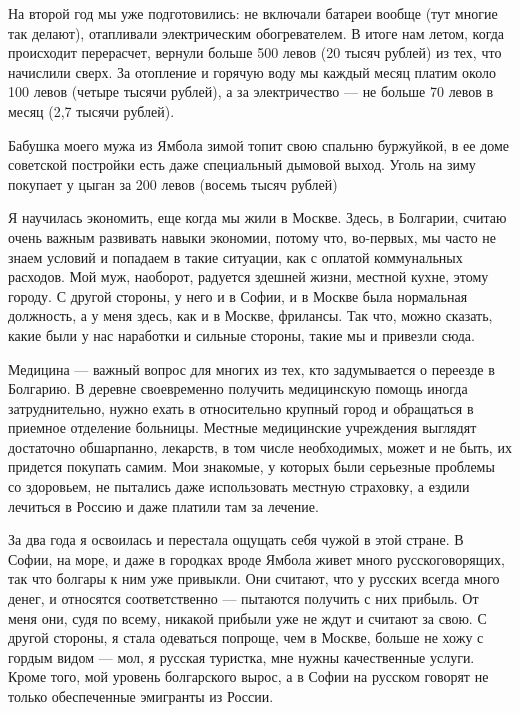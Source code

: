 На второй год мы уже подготовились: не включали батареи вообще (тут многие так делают), отапливали электрическим обогревателем. В итоге нам летом, когда происходит перерасчет, вернули больше 500 левов (20 тысяч рублей) из тех, что начислили сверх. За отопление и горячую воду мы каждый месяц платим около 100 левов (четыре тысячи рублей), а за электричество — не больше 70 левов в месяц (2,7 тысячи рублей).

\begin{fancyquotes}
    Бабушка моего мужа из Ямбола зимой топит свою спальню буржуйкой, в ее доме советской постройки есть даже специальный дымовой выход. Уголь на зиму покупает у цыган за 200 левов (восемь тысяч рублей)
\end{fancyquotes}

Я научилась экономить, еще когда мы жили в Москве. Здесь, в Болгарии, считаю очень важным развивать навыки экономии, потому что, во-первых, мы часто не знаем условий и попадаем в такие ситуации, как с оплатой коммунальных расходов. Мой муж, наоборот, радуется здешней жизни, местной кухне, этому городу. С другой стороны, у него и в Софии, и в Москве была нормальная должность, а у меня здесь, как и в Москве, фрилансы. Так что, можно сказать, какие были у нас наработки и сильные стороны, такие мы и привезли сюда.

Медицина — важный вопрос для многих из тех, кто задумывается о переезде в Болгарию. В деревне своевременно получить медицинскую помощь иногда затруднительно, нужно ехать в относительно крупный город и обращаться в приемное отделение больницы. Местные медицинские учреждения выглядят достаточно обшарпанно, лекарств, в том числе необходимых, может и не быть, их придется покупать самим. Мои знакомые, у которых были серьезные проблемы со здоровьем, не пытались даже использовать местную страховку, а ездили лечиться в Россию и даже платили там за лечение.

За два года я освоилась и перестала ощущать себя чужой в этой стране. В Софии, на море, и даже в городках вроде Ямбола живет много русскоговорящих, так что болгары к ним уже привыкли. Они считают, что у русских всегда много денег, и относятся соответственно — пытаются получить с них прибыль. От меня они, судя по всему, никакой прибыли уже не ждут и считают за свою. С другой стороны, я стала одеваться попроще, чем в Москве, больше не хожу с гордым видом — мол, я русская туристка, мне нужны качественные услуги. Кроме того, мой уровень болгарского вырос, а в Софии на русском говорят не только обеспеченные эмигранты из России.

